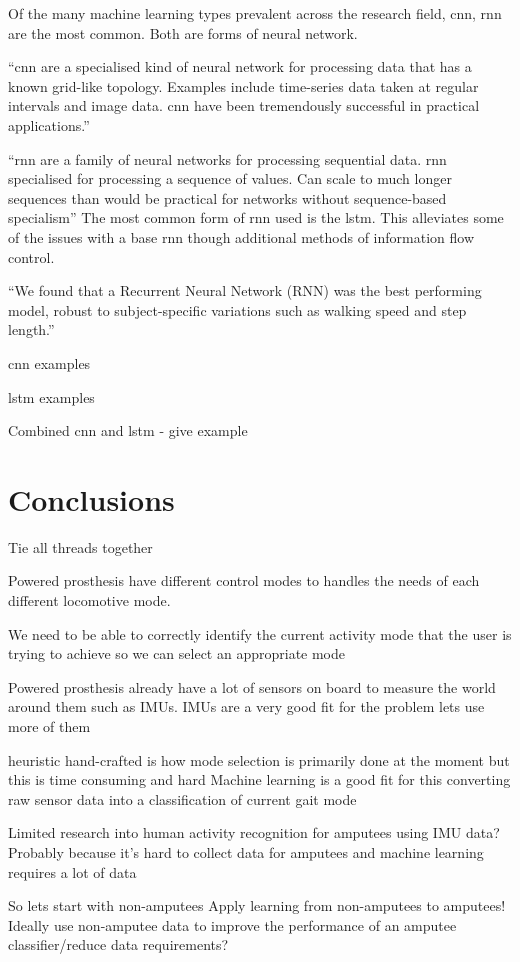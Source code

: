 Of the many machine learning types prevalent across the research field, \acrfull{cnn}, \acrfull{rnn} are the most common. Both are forms of neural network.

``\acrfull{cnn} are a specialised kind of neural network for processing data that has a known grid-like topology. Examples include time-series data taken at regular intervals and image data. \acrshort{cnn} have been tremendously successful in practical applications.''\cite{Goodfellow2015}

``\acrfull{rnn} are a family of neural networks for processing sequential data. \acrshort{rnn} specialised for processing a sequence of values. Can scale to much longer sequences than would be practical for networks without sequence-based specialism''\cite{Goodfellow2015} The most common form of \acrshort{rnn} used is the \acrfull{lstm}. This alleviates some of the issues with a base \acrshort{rnn} though additional methods of information flow control.

``We found that a Recurrent Neural Network (RNN) was the best performing model, robust to subject-specific variations such as walking speed and step length.''\cite{Rai2019a}


\acrshort{cnn} examples \cite{Martinez-Hernandez2021}

\acrshort{lstm} examples

Combined \acrshort{cnn} and \acrshort{lstm} - give example



\section{Conclusions}
Tie all threads together

Powered prosthesis have different control modes to handles the needs of each different locomotive mode.

We need to be able to correctly identify the current activity mode that the user is trying to achieve so we can select an appropriate mode

Powered prosthesis already have a lot of sensors on board to measure the world around them such as IMUs. IMUs are a very good fit for the problem lets use more of them

heuristic hand-crafted is how mode selection is primarily done at the moment but this is time consuming and hard
Machine learning is a good fit for this converting raw sensor data into a classification of current gait mode

Limited research into human activity recognition for amputees using IMU data?
Probably because it's hard to collect data for amputees and machine learning requires a lot of data

So lets start with non-amputees
Apply learning from non-amputees to amputees!
Ideally use non-amputee data to improve the performance of an amputee classifier/reduce data requirements?